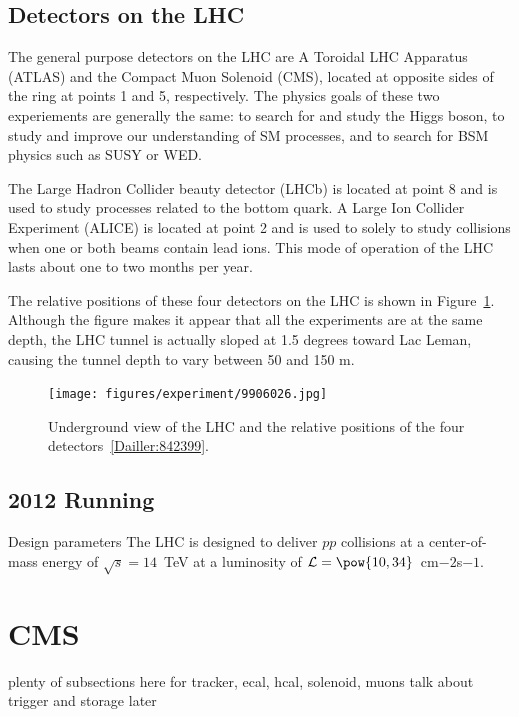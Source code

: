 \subsection{Detectors on the LHC\label{sec:detectors}}

The general purpose detectors on the LHC are A Toroidal LHC Apparatus (ATLAS) and the Compact Muon
Solenoid (CMS), located at opposite sides of the ring at points 1 and 5, respectively. The physics
goals of these two experiements are generally the same: to search for and study the Higgs boson,
to study and improve our understanding of SM processes, and to search for BSM physics such as
SUSY or WED.

The Large Hadron Collider beauty detector (LHCb) is located at point 8 and is used
to study processes related to the bottom quark. A Large Ion Collider Experiment (ALICE) is located
at point 2 and is used to solely to study collisions when one or both beams contain lead ions. This
mode of operation of the LHC lasts about one to two months per year.

The relative positions of these four detectors on the LHC is shown in Figure~\ref{fig:lhc_detectors}.
Although the figure makes it appear that all the experiments are at the same depth, the LHC tunnel is
actually sloped at 1.5 degrees toward Lac Leman, causing the tunnel depth to vary between 50 and 150 m.

\begin{figure}[h]
 \begin{center}
    \texttt{[image: figures/experiment/9906026.jpg]}
      \end{center}
\caption{Underground view of the LHC and the relative positions of the four detectors~\ref{Dailler:842399}.}
\label{fig:lhc_detectors}
\end{figure}

\subsection{2012 Running}
Design parameters
The LHC is designed to deliver $pp$ collisions at a center-of-mass energy of $\sqrt{s} = 14$~TeV at a luminosity of $\mathcal{L} = \pow{10,34}$~cm$-2$s$-1$. 

\section{CMS\label{sec:CMS}}
plenty of subsections here for tracker, ecal, hcal, solenoid, muons
talk about trigger and storage later

